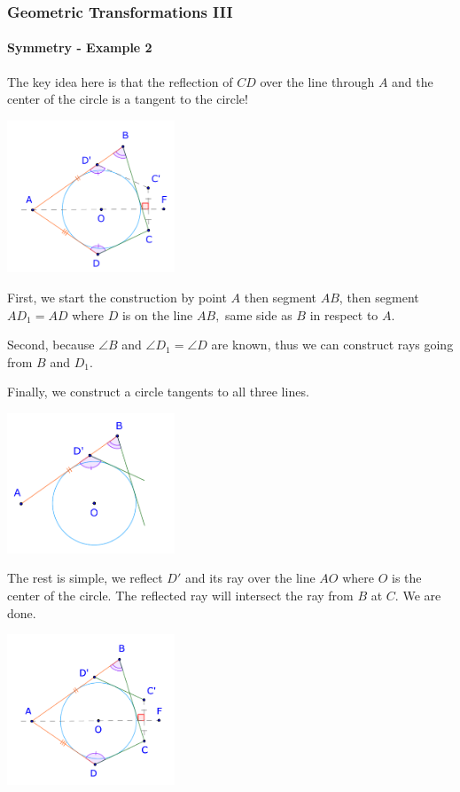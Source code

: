 \documentclass[8pt,xcolor=table,dvipsnames]{beamer}
\begin{document}
\begin{frame}[t]
    \frametitle{Geometric Transformations III}
    \framesubtitle{Symmetry - Example 2}
    \begin{overprint}
        The key idea here is that the reflection of $CD$ over the line through $A$ and the center of the circle is a tangent to the circle!
        \begin{center}
            \includegraphics[width=5cm]{./svg/pdf/symmetry-2d.pdf}
        \end{center}
        First, we start the construction by point $A$ then segment $AB$,
        then segment $AD_1 = AD$ where $D$ is on the line $AB,$ same side as $B$ in respect to $A$.

        \bigbreak
        Second, because $\angle B$ and $\angle D_1= \angle D$ are known, thus we can construct rays going from $B$ and $D_1.$
        
        \bigbreak
        Finally, we construct a circle tangents to all three lines.
        \begin{center}
            \includegraphics[width=5cm]{./svg/pdf/symmetry-2b.pdf}
        \end{center}
        The rest is simple, we reflect $D'$ and its ray over the line $AO$ where $O$ is the center of the circle.
        The reflected ray will intersect the ray from $B$ at $C.$ We are done.
        \begin{center}
            \includegraphics[width=5cm]{./svg/pdf/symmetry-2c.pdf}
        \end{center}
    \end{overprint}
\end{frame}
\end{document}

